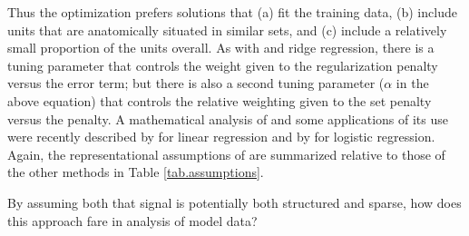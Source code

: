 

Thus the optimization prefers solutions that (a) fit the training data, (b) include units that are anatomically situated in similar sets, and (c) include a relatively small proportion of the units overall.  As with {\lasso} and ridge regression, there is a tuning parameter that controls the weight given to the regularization penalty versus the error term; but there is also a second tuning parameter ($\alpha$ in the above equation) that controls the relative weighting given to the set penalty versus the {\lasso} penalty.  A mathematical analysis of {\soslasso} and some applications of its use were recently described by  for linear regression and by  for logistic regression. Again, the representational assumptions of {\soslasso} are summarized relative to those of the other methods in Table \ref{tab.assumptions}.

By assuming both that signal is potentially both structured and sparse, how does this approach fare in analysis of model data?

